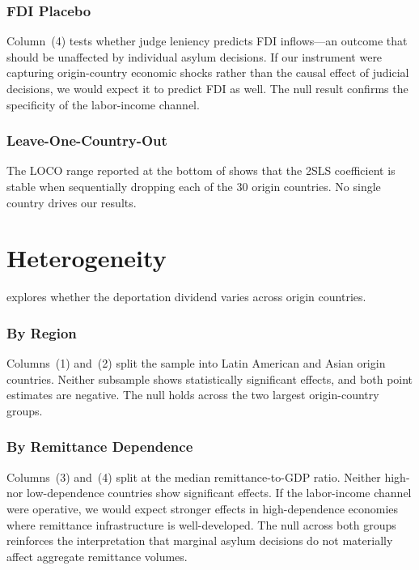 \documentclass[12pt]{article}
\begin{document}
\subsubsection*{FDI Placebo} Column~(4) tests whether judge leniency predicts FDI inflows---an outcome that should be unaffected by individual asylum decisions. If our instrument were capturing origin-country economic shocks rather than the causal effect of judicial decisions, we would expect it to predict FDI as well. The null result confirms the specificity of the labor-income channel.

\subsubsection*{Leave-One-Country-Out} The LOCO range reported at the bottom of  shows that the 2SLS coefficient is stable when sequentially dropping each of the 30 origin countries. No single country drives our results.



\section{Heterogeneity}

 explores whether the deportation dividend varies across origin countries.

\subsubsection*{By Region} Columns~(1) and~(2) split the sample into Latin American and Asian origin countries. Neither subsample shows statistically significant effects, and both point estimates are negative. The null holds across the two largest origin-country groups.

\subsubsection*{By Remittance Dependence} Columns~(3) and~(4) split at the median remittance-to-GDP ratio. Neither high- nor low-dependence countries show significant effects. If the labor-income channel were operative, we would expect stronger effects in high-dependence economies where remittance infrastructure is well-developed. The null across both groups reinforces the interpretation that marginal asylum decisions do not materially affect aggregate remittance volumes.
\end{document}
